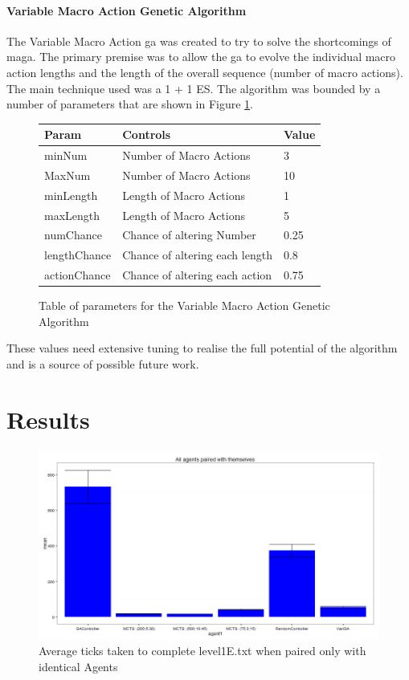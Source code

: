 \documentclass{IEEEtran}
\begin{document}
\paragraph{Variable Macro Action Genetic Algorithm}
The Variable Macro Action \gls{ga} was created to try to solve the shortcomings of \gls{maga}. The primary premise was to allow the \gls{ga} to evolve the individual macro action lengths and the length of the overall sequence (number of macro actions). The main technique used was a 1 + 1 ES. The algorithm was bounded by a number of parameters that are shown in Figure \ref{vmagaTable}.

\begin{figure}[h]
\centering
\begin{tabular}{| l | l | l |}
\hline
\textbf{Param} & \textbf{Controls} & \textbf{Value} \\
\hline
minNum & Number of Macro Actions & 3 \\
MaxNum & Number of Macro Actions & 10 \\
minLength & Length of Macro Actions & 1 \\
maxLength & Length of Macro Actions & 5 \\
numChance & Chance of altering Number & 0.25 \\
lengthChance & Chance of altering each length & 0.8 \\
actionChance & Chance of altering each action & 0.75 \\
\hline
\end{tabular}
\caption{Table of parameters for the Variable Macro Action Genetic Algorithm}
\label{vmagaTable}
\end{figure}
These values need extensive tuning to realise the full potential of the algorithm and is a source of possible future work.
\pagebreak
\section{Results}

\begin{figure}[ht]
\centering
\includegraphics[width=\linewidth]{level1E-txt-pairs-ticks}
\caption{Average ticks taken to complete level1E.txt when paired only with identical Agents}
\label{1epairedTicks}
\end{figure}
\end{document}
